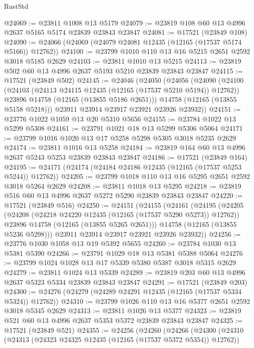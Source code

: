 \begin{lexlean}{RustStd}
\begin{coremodule}
@24069 := @23811 @1008 @13 @5179
@24079 := @23819 @108 @60 @13 @4996 @2637 @5165 @5174 @23839 @23843 @23847
@24081 := @17521 (@23849 @108)
@24090 := @24066 (@24069 (@24079 @24081 @12435 (@12165 (@17537 @5174 @5166)) @12762))
@24100 := @23799 @1010 @110 @13 @16 @5215 @2651 @2592 @3018 @5185 @2629
@24103 := @23811 @1010 @13 @5215
@24113 := @23819 @502 @60 @13 @4996 @2637 @5193 @5210 @23839 @23843 @23847
@24115 := @17521 (@23849 @502)
@24145 := @24046
    (@24050
      (@24056
        (@24090
          (@24100
            (@24103 (@24113 @24115 @12435 (@12165 (@17537 @5210 @5194)) @12762))
            @23896
            @14758
            (@12165 (@13855 @5186 @2651)))
          @14758
          (@12165 (@13855 @5158 @5218)))
        @23911
        @23914
        @23917
        @23921
        @23926
        @23932))
@24151 := @23776 @1022 @1059 @13 @20 @5310 @5656
@24155 := @23784 @1022 @13 @5299 @5308
@24161 := @23791 @1021 @18 @13 @5299 @5306 @5064
@24171 := @23799 @1016 @1020 @13 @17 @5258 @5298 @5305 @3018 @5235 @2629
@24174 := @23811 @1016 @13 @5258
@24184 := @23819 @164 @60 @13 @4996 @2637 @5243 @5253 @23839 @23843 @23847
@24186 := @17521 (@23849 @164)
@24195 := @24171 (@24174 (@24184 @24186 @12435 (@12165 (@17537 @5253 @5244)) @12762))
@24205 := @23799 @1018 @110 @13 @16 @5295 @2651 @2592 @3018 @5264 @2629
@24208 := @23811 @1018 @13 @5295
@24218 := @23819 @516 @60 @13 @4996 @2637 @5272 @5290 @23839 @23843 @23847
@24220 := @17521 (@23849 @516)
@24250 := @24151
    (@24155
      (@24161
        (@24195
          (@24205
            (@24208 (@24218 @24220 @12435 (@12165 (@17537 @5290 @5273)) @12762))
            @23896
            @14758
            (@12165 (@13855 @5265 @2651)))
          @14758
          (@12165 (@13855 @5236 @5298)))
        @23911
        @23914
        @23917
        @23921
        @23926
        @23932))
@24256 := @23776 @1030 @1058 @13 @19 @5392 @5655
@24260 := @23784 @1030 @13 @5381 @5390
@24266 := @23791 @1029 @18 @13 @5381 @5388 @5064
@24276 := @23799 @1024 @1028 @13 @17 @5339 @5380 @5387 @3018 @5315 @2629
@24279 := @23811 @1024 @13 @5339
@24289 := @23819 @203 @60 @13 @4996 @2637 @5323 @5334 @23839 @23843 @23847
@24291 := @17521 (@23849 @203)
@24300 := @24276 (@24279 (@24289 @24291 @12435 (@12165 (@17537 @5334 @5324)) @12762))
@24310 := @23799 @1026 @110 @13 @16 @5377 @2651 @2592 @3018 @5345 @2629
@24313 := @23811 @1026 @13 @5377
@24323 := @23819 @521 @60 @13 @4996 @2637 @5353 @5372 @23839 @23843 @23847
@24325 := @17521 (@23849 @521)
@24355 := @24256
    (@24260
      (@24266
        (@24300
          (@24310
            (@24313 (@24323 @24325 @12435 (@12165 (@17537 @5372 @5354)) @12762))

\end{coremodule}
\end{lexlean}
